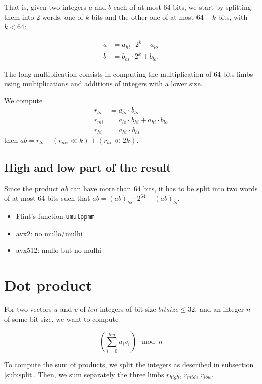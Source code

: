 \documentclass[a4paper]{article}
\begin{document}
That is, given two integers $a$ and $b$ each of at most 64 bits, we start by splitting them into 2 words, one of $k$ bits and the other one of at most $64-k$ bits, with $k<64$:

\begin{align*}
    a &= a_{hi}\cdot 2^{k} + a_{lo} \\
    b &= b_{hi}\cdot 2^{k} + b_{lo}.
\end{align*}

The long multiplication consists in computing the multiplication of 64 bits limbs using multiplications and additions of integers with a lower size.

We compute
\begin{align*}
    r_{lo} &= a_{lo}\cdot b_{lo} \\
    r_{mi} &= a_{lo}\cdot b_{hi} + a_{hi}\cdot b_{lo} \\
    r_{hi} &= a_{hi}\cdot b_{hi}
\end{align*}
then $ab = r_{lo} + (r_{mi} \ll k) + (r_{hi} \ll 2k)$.


\subsection{High and low part of the result}

Since the product $ab$ can have more than 64 bits, it has to be split into two words of at most 64 bits such that $ab = (ab)_{hi}\cdot 2^{64} + (ab)_{lo}$.

\begin{itemize}
    \item Flint's function \texttt{umulppmm}
    \item avx2: no mullo/mulhi
    \item avx512: mullo but no mulhi
\end{itemize} 


\section{Dot product}

For two vectors $u$ and $v$ of $len$ integers of bit size $bitsize \le 32$, and an integer $n$ of some bit size, we want to compute

\[\left(\sum_{i=0}^{len}u_iv_i\right) \mod n\]

To compute the sum of products, we split the integers as described in subsection \ref{sub:split}. Then, we sum separately the three limbs $r_{high}$, $r_{mid}$, $r_{low}$. %
\end{document}
